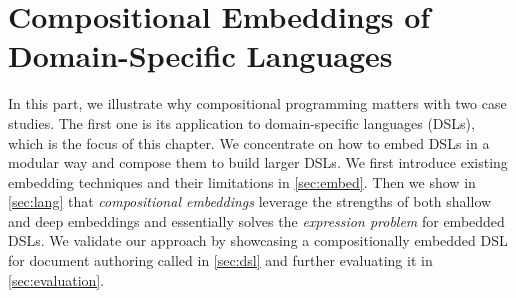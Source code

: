\chapter{Compositional Embeddings of Domain-Specific Languages} \label{ch:embedding}

In this part, we illustrate why compositional programming matters with two case
studies. The first one is its application to domain-specific languages (DSLs),
which is the focus of this chapter. We concentrate on how to embed DSLs in a
modular way and compose them to build larger DSLs. We first introduce existing
embedding techniques and their limitations in \autoref{sec:embed}. Then we show
in \autoref{sec:lang} that \emph{compositional embeddings} leverage the
strengths of both shallow and deep embeddings and essentially solves the
\emph{expression problem} for embedded DSLs. We validate our approach by
showcasing a compositionally embedded DSL for document authoring called \ExT in
\autoref{sec:dsl} and further evaluating it in \autoref{sec:evaluation}.





